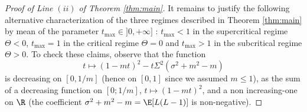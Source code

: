  
\begin{proof}[Proof of Line $(ii)$ of Theorem \ref{thm:main}]
%
It remains to justify the following alternative characterization of the three regimes described in Theorem \ref{thm:main} by mean of the parameter  $t_{\max} \in ]0,+\infty]$ : $t_{\max}<1$ in the supercritical regime $\Theta<0$, $t_{\max} =1$ in the critical regime $\Theta=0$ and $t_{\max}>1$ in the subcritical regime $\Theta>0$. To check these claims, observe that the function 
$$t \mapsto (1-mt)^2- t\Sigma^2 (\sigma^2 +m^2-m)$$
is decreasing on $[0,1/m]$ (hence on $[0,1]$ since we assumed $m\le 1$), as the sum of a decreasing function on $[0;1/m]$, $t \mapsto (1-mt)^2$, and a non increasing-one on $\R$ (the coefficient $\sigma^2 +m^2-m = \E[L(L-1)]$ is non-negative). \end{proof}

